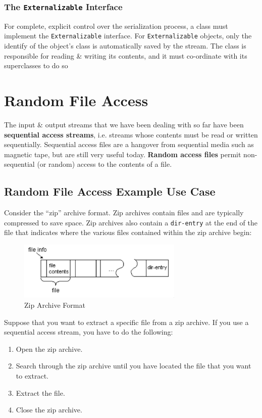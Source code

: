 \documentclass[a4paper,11pt]{article}
\begin{document}
\subsubsection{The \texttt{Externalizable} Interface}
For complete, explicit control over the serialization process, a class must implement the
\verb|Externalizable| interface.
For \verb|Externalizable| objects, only the identify of the object's class is automatically saved by the 
stream.
The class is responsible for reading \& writing its contents, and it must co-ordinate with its superclasses
to do so

\section{Random File Access}
The input \& output streams that we have been dealing with so far have been \textbf{sequential access streams}, 
i.e. streams whose contents must be read or written sequentially.
Sequential access files are a hangover from sequential media such as magnetic tape, but are still very useful
today.
\textbf{Random access files} permit non-sequential (or random) access to the contents of a file.

\subsection{Random File Access Example Use Case}
Consider the ``zip'' archive format.
Zip archives contain files and are typically compressed to save space.
Zip archives also contain a \verb|dir-entry| at the end of the file that indicates where the various files
contained within the zip archive begin:
\begin{figure}[H]
    \centering
    \includegraphics[width=0.7\textwidth]{./images/dir-entry.png}
    \caption{Zip Archive Format}
\end{figure}

Suppose that you want to extract a specific file from a zip archive.
If you use a sequential access stream, you have to do the following:
\begin{enumerate}
    \item   Open the zip archive.
    \item   Search through the zip archive until you have located the file that you want to extract.
    \item   Extract the file.
    \item   Close the zip archive.
\end{enumerate}
\end{document}
